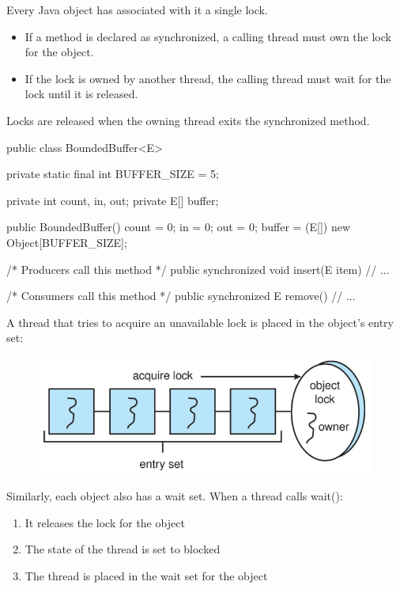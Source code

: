 Every Java object has associated with it a single lock.

\begin{itemize}
    \item[] If a method is declared as synchronized, a calling thread must own the lock for the object.
    \item[] If the lock is owned by another thread, the calling thread must wait for the lock until it is released.
\end{itemize}

Locks are released when the owning thread exits the synchronized method.

\begin{codeInJava}
public class BoundedBuffer<E> {

  private static final int BUFFER_SIZE = 5;

  private int count, in, out;
  private E[] buffer;

  public BoundedBuffer() {
    count = 0;
    in = 0;
    out = 0;
    buffer = (E[]) new Object[BUFFER_SIZE];
  }

  /* Producers call this method */
  public synchronized void insert(E item) {
    // ...
  }

  /* Consumers call this method */
  public synchronized E remove() {
    // ...
  }
}

\end{codeInJava}

A thread that tries to acquire an unavailable lock is placed in the
object’s entry set:

\begin{figure}[htbp]
    \centering
    \includegraphics[width=0.42\linewidth]{img/advcasdv.png}
\end{figure}

Similarly, each object also has a wait set.
\newpage
When a thread calls wait():

\begin{enumerate}
    \item It releases the lock for the object
    \item The state of the thread is set to blocked
    \item The thread is placed in the wait set for the object
\end{enumerate}

